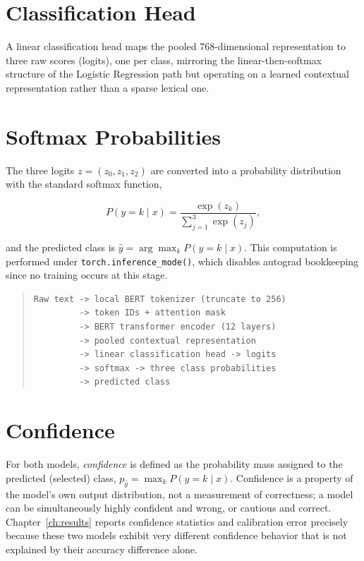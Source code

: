 \section{Classification Head}

A linear classification head maps the pooled 768-dimensional representation to three raw scores (logits), one per class, mirroring the linear-then-softmax structure of the Logistic Regression path but operating on a learned contextual representation rather than a sparse lexical one.

\section{Softmax Probabilities}

The three logits $z = (z_0, z_1, z_2)$ are converted into a probability distribution with the standard softmax function,

\begin{equation}
P(y = k \mid x) = \frac{\exp(z_k)}{\sum_{j=1}^{3} \exp(z_j)},
\end{equation}

and the predicted class is $\hat{y} = \arg\max_k P(y=k \mid x)$. This computation is performed under \texttt{torch.inference\_\pbrk mode()}, which disables autograd bookkeeping since no training occurs at this stage.

\begin{quote}
\raggedright\small
\begin{verbatim}
Raw text -> local BERT tokenizer (truncate to 256)
         -> token IDs + attention mask
         -> BERT transformer encoder (12 layers)
         -> pooled contextual representation
         -> linear classification head -> logits
         -> softmax -> three class probabilities
         -> predicted class
\end{verbatim}
\end{quote}

\section{Confidence}

For both models, \emph{confidence} is defined as the probability mass assigned to the predicted (selected) class, $p_{\hat{y}} = \max_k P(y=k \mid x)$. Confidence is a property of the model's own output distribution, not a measurement of correctness; a model can be simultaneously highly confident and wrong, or cautious and correct. Chapter~\ref{ch:results} reports confidence statistics and calibration error precisely because these two models exhibit very different confidence behavior that is not explained by their accuracy difference alone.

